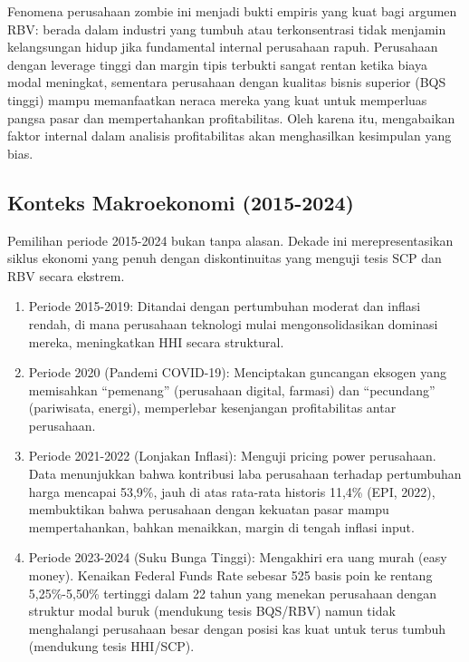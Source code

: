 \documentclass[12pt,a4paper]{report}
\providecommand{\tightlist}{%
  \setlength{\itemsep}{0pt}\setlength{\parskip}{0pt}%
}
\begin{document}
Fenomena perusahaan zombie ini menjadi bukti empiris yang kuat bagi
argumen RBV: berada dalam industri yang tumbuh atau terkonsentrasi tidak
menjamin kelangsungan hidup jika fundamental internal perusahaan rapuh.
Perusahaan dengan leverage tinggi dan margin tipis terbukti sangat
rentan ketika biaya modal meningkat, sementara perusahaan dengan
kualitas bisnis superior (BQS tinggi) mampu memanfaatkan neraca mereka
yang kuat untuk memperluas pangsa pasar dan mempertahankan
profitabilitas. Oleh karena itu, mengabaikan faktor internal dalam
analisis profitabilitas akan menghasilkan kesimpulan yang bias.

\hypertarget{konteks-makroekonomi-2015-2024}{%
\subsection{Konteks Makroekonomi
(2015-2024)}\label{konteks-makroekonomi-2015-2024}}

Pemilihan periode 2015-2024 bukan tanpa alasan. Dekade ini
merepresentasikan siklus ekonomi yang penuh dengan diskontinuitas yang
menguji tesis SCP dan RBV secara ekstrem.

\begin{enumerate}
\def\labelenumi{\arabic{enumi}.}
\tightlist
\item
  Periode 2015-2019: Ditandai dengan pertumbuhan moderat dan inflasi
  rendah, di mana perusahaan teknologi mulai mengonsolidasikan dominasi
  mereka, meningkatkan HHI secara struktural.
\item
  Periode 2020 (Pandemi COVID-19): Menciptakan guncangan eksogen yang
  memisahkan ``pemenang'' (perusahaan digital, farmasi) dan
  ``pecundang'' (pariwisata, energi), memperlebar kesenjangan
  profitabilitas antar perusahaan.
\item
  Periode 2021-2022 (Lonjakan Inflasi): Menguji pricing power
  perusahaan. Data menunjukkan bahwa kontribusi laba perusahaan terhadap
  pertumbuhan harga mencapai 53,9\%, jauh di atas rata-rata historis
  11,4\% (EPI, 2022), membuktikan bahwa perusahaan dengan kekuatan pasar
  mampu mempertahankan, bahkan menaikkan, margin di tengah inflasi
  input.
\item
  Periode 2023-2024 (Suku Bunga Tinggi): Mengakhiri era uang murah (easy
  money). Kenaikan Federal Funds Rate sebesar 525 basis poin ke rentang
  5,25\%-5,50\% tertinggi dalam 22 tahun yang menekan perusahaan dengan
  struktur modal buruk (mendukung tesis BQS/RBV) namun tidak menghalangi
  perusahaan besar dengan posisi kas kuat untuk terus tumbuh (mendukung
  tesis HHI/SCP).
\end{enumerate}
\end{document}
